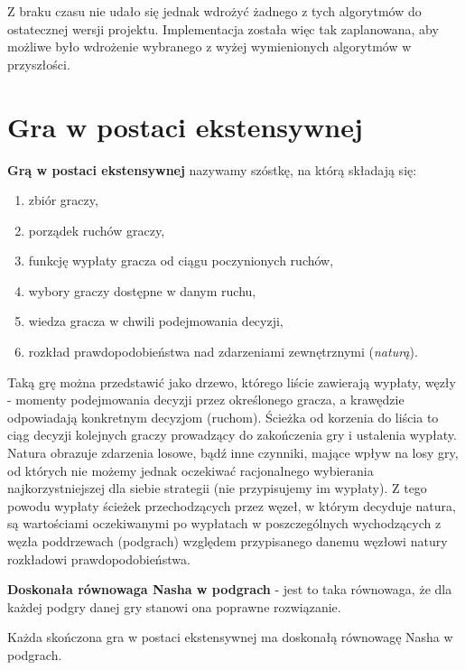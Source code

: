 \documentclass[polish]{standalone}
\begin{document}
Z braku czasu nie udało się jednak wdrożyć żadnego z tych algorytmów do ostatecznej wersji projektu. Implementacja
została więc tak zaplanowana, aby możliwe było wdrożenie wybranego z wyżej wymienionych algorytmów w przyszłości.

\section{Gra w postaci ekstensywnej}

\begin{definition}
\textbf{Grą w postaci ekstensywnej} nazywamy szóstkę, na którą składają się:
\begin{enumerate}
\item zbiór graczy,
\item porządek ruchów graczy,
\item funkcję wypłaty gracza od ciągu poczynionych ruchów,
\item wybory graczy dostępne w danym ruchu,
\item wiedza gracza w chwili podejmowania decyzji,
\item rozkład prawdopodobieństwa nad zdarzeniami zewnętrznymi (\textit{naturą}).
\end{enumerate}
\cite[str.~77--78]{FT-GT}
\end{definition}

Taką grę można przedstawić jako drzewo, którego liście zawierają wypłaty, węzły - momenty podejmowania decyzji przez
określonego gracza, a krawędzie odpowiadają konkretnym decyzjom (ruchom). Ścieżka od korzenia do liścia to ciąg decyzji
kolejnych graczy prowadzący do zakończenia gry i ustalenia wypłaty. Natura obrazuje zdarzenia losowe, bądź inne
czynniki, mające wpływ na losy gry, od których nie możemy jednak oczekiwać racjonalnego wybierania najkorzystniejszej
dla siebie strategii (nie przypisujemy im wypłaty). Z tego powodu wypłaty ścieżek przechodzących przez węzeł, w którym
decyduje natura, są wartościami oczekiwanymi po wypłatach w poszczególnych wychodzących z węzła poddrzewach (podgrach)
względem przypisanego danemu węzłowi natury rozkładowi prawdopodobieństwa.

\begin{definition}
\textbf{Doskonała równowaga Nasha w podgrach} - jest to taka równowaga, że dla każdej podgry danej gry stanowi ona
poprawne rozwiązanie. 
\end{definition}

\begin{theorem}
Każda skończona gra w postaci ekstensywnej ma doskonałą równowagę Nasha w podgrach. 
\end{theorem}
\end{document}

